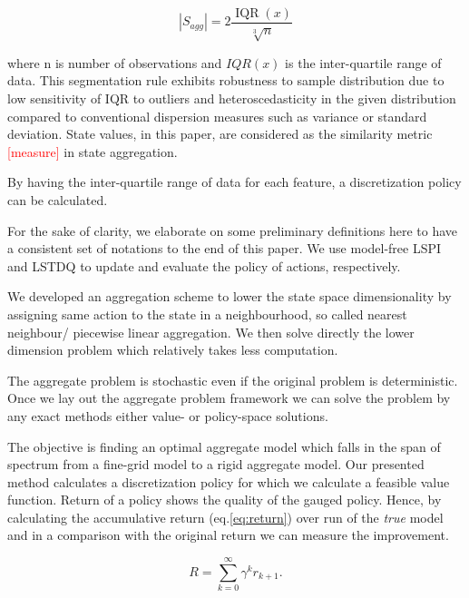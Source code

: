 \documentclass{article}
\begin{document}
    \begin{equation}
        |S_{agg}| = 2 \frac{\operatorname{IQR}(x)}{\sqrt[3]{n}}
    \end{equation}

    where n is number of observations and $IQR(x)$ is the inter-quartile range of data.
    This segmentation rule exhibits robustness to sample distribution due to low sensitivity of IQR to outliers and
    heteroscedasticity in the given distribution compared to conventional dispersion measures such as variance or
    standard deviation.
    State values, in this paper, are considered as the similarity metric \textcolor{red}{[measure]} in state
    aggregation.

    By having the inter-quartile range of data for each feature, a discretization policy can be calculated.


    For the sake of clarity, we elaborate on some preliminary definitions here to have a consistent set of notations
    to the end of this paper. We use model-free LSPI and LSTDQ \citep{Lagoudakis2003} to update and
    evaluate the policy of actions, respectively.

    We developed an aggregation scheme to lower the state space dimensionality by assigning same action to the state
    in a neighbourhood, so called nearest neighbour/ piecewise linear aggregation.
    We then solve directly the lower dimension problem which relatively takes less computation.

    The aggregate problem is stochastic even if the original problem is deterministic.
    Once we lay out the aggregate problem framework we can solve the problem by any exact methods either value- or
    policy-space solutions.

    The objective is finding an optimal aggregate model which falls in the span of spectrum from a fine-grid model
    to a rigid aggregate model.
    Our presented method calculates a discretization policy for which we calculate a feasible value function.
    Return of a policy shows the quality of the gauged policy.
    Hence, by calculating the accumulative return (eq.\ref{eq:return}) over run of the \textit{true} model and in a
    comparison with the original return we can measure the improvement.

    \begin{equation}
        R = \sum_{k=0}^{\infty} \gamma^{k} r_{k+1}. \label{eq:return}
    \end{equation}
\end{document}
